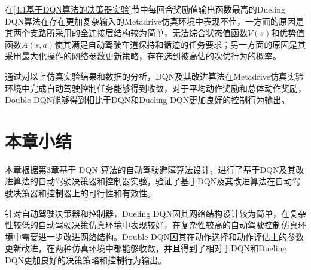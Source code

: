 在\ref{4.1基于DQN算法的决策器实验}节中每回合奖励值输出函数最高的Dueling DQN算法在存在更加复杂输入的Metadrive仿真环境中表现不佳，一方面的原因是其两个支路所采用的全连接层结构较为简单，无法综合状态值函数$V(s)$和优势值函数$A(s,a)$使其满足自动驾驶车道保持和循迹的任务要求；另一方面的原因是其采用最大化操作的网络参数更新策略，存在选到被高估的次优行为的概率。

通过对以上仿真实验结果和数据的分析，DQN及其改进算法在Metadrive仿真实验环境中完成自动驾驶控制任务能够得到收敛，对于平均动作奖励和总体动作奖励，Double DQN能够得到相比于DQN和Dueling DQN更加良好的控制行为输出。

\section{本章小结}

本章根据第3章基于 DQN 算法的自动驾驶避障算法设计，进行了基于DQN及其改进算法的自动驾驶决策器和控制器实验，验证了基于DQN及其改进算法在自动驾驶决策器和控制器上的可行性和有效性。

针对自动驾驶决策器和控制器，Dueling DQN因其网络结构设计较为简单，在复杂性较低的自动驾驶决策仿真环境中表现较好，在复杂性较高的自动驾驶控制仿真环境中需要进一步改进网络结构。Double DQN因其在动作选择和动作评估上的参数更新改进，在两种仿真环境中都能够收敛，并且得到了相对于DQN和Dueling DQN更加良好的决策策略和控制行为输出。
